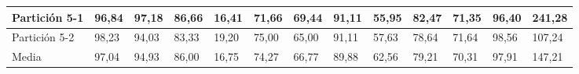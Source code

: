 \documentclass[10pt,a4paper]{article}
\begin{document}
\begin{table}[H]
{\begin{tabular}{|l|l|l|l|l|l|l|l|l|l|l|l|l|}
Partición 5-1                              & 96,84        & 97,18         & 86,66   & 16,41 & 71,66        & 69,44         & 91,11   & 55,95 & 82,47        & 71,35         & 96,40   & 241,28 \\ \hline
Partición 5-2                              & 98,23        & 94,03         & 83,33   & 19,20 & 75,00        & 65,00         & 91,11   & 57,63 & 78,64        & 71,64         & 98,56   & 107,24 \\ \hline
Media                                      & 97,04        & 94,93         & 86,00   & 16,75 & 74,27        & 66,77         & 89,88   & 62,56 & 79,21        & 70,31         & 97,91   & 147,21 \\ \hline
\end{tabular}}
\end{table}
\end{document}
